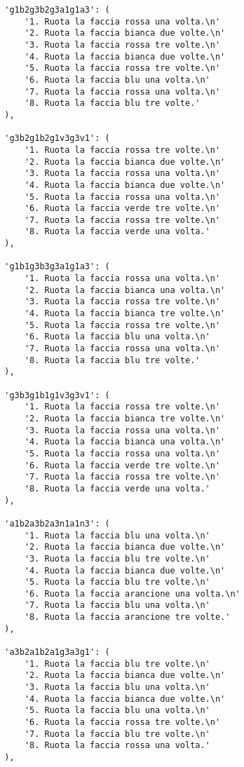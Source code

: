 \begin{lstlisting}
        'g1b2g3b2g3a1g1a3': (
            '1. Ruota la faccia rossa una volta.\n'
            '2. Ruota la faccia bianca due volte.\n'
            '3. Ruota la faccia rossa tre volte.\n'
            '4. Ruota la faccia bianca due volte.\n'
            '5. Ruota la faccia rossa tre volte.\n'
            '6. Ruota la faccia blu una volta.\n'
            '7. Ruota la faccia rossa una volta.\n'
            '8. Ruota la faccia blu tre volte.'
        ),

        'g3b2g1b2g1v3g3v1': (
            '1. Ruota la faccia rossa tre volte.\n'
            '2. Ruota la faccia bianca due volte.\n'
            '3. Ruota la faccia rossa una volta.\n'
            '4. Ruota la faccia bianca due volte.\n'
            '5. Ruota la faccia rossa una volta.\n'
            '6. Ruota la faccia verde tre volte.\n'
            '7. Ruota la faccia rossa tre volte.\n'
            '8. Ruota la faccia verde una volta.'
        ),

        'g1b1g3b3g3a1g1a3': (
            '1. Ruota la faccia rossa una volta.\n'
            '2. Ruota la faccia bianca una volta.\n'
            '3. Ruota la faccia rossa tre volte.\n'
            '4. Ruota la faccia bianca tre volte.\n'
            '5. Ruota la faccia rossa tre volte.\n'
            '6. Ruota la faccia blu una volta.\n'
            '7. Ruota la faccia rossa una volta.\n'
            '8. Ruota la faccia blu tre volte.'
        ),

        'g3b3g1b1g1v3g3v1': (
            '1. Ruota la faccia rossa tre volte.\n'
            '2. Ruota la faccia bianca tre volte.\n'
            '3. Ruota la faccia rossa una volta.\n'
            '4. Ruota la faccia bianca una volta.\n'
            '5. Ruota la faccia rossa una volta.\n'
            '6. Ruota la faccia verde tre volte.\n'
            '7. Ruota la faccia rossa tre volte.\n'
            '8. Ruota la faccia verde una volta.'
        ),

        'a1b2a3b2a3n1a1n3': (
            '1. Ruota la faccia blu una volta.\n'
            '2. Ruota la faccia bianca due volte.\n'
            '3. Ruota la faccia blu tre volte.\n'
            '4. Ruota la faccia bianca due volte.\n'
            '5. Ruota la faccia blu tre volte.\n'
            '6. Ruota la faccia arancione una volta.\n'
            '7. Ruota la faccia blu una volta.\n'
            '8. Ruota la faccia arancione tre volte.'
        ),

        'a3b2a1b2a1g3a3g1': (
            '1. Ruota la faccia blu tre volte.\n'
            '2. Ruota la faccia bianca due volte.\n'
            '3. Ruota la faccia blu una volta.\n'
            '4. Ruota la faccia bianca due volte.\n'
            '5. Ruota la faccia blu una volta.\n'
            '6. Ruota la faccia rossa tre volte.\n'
            '7. Ruota la faccia blu tre volte.\n'
            '8. Ruota la faccia rossa una volta.'
        ),


\end{lstlisting}
